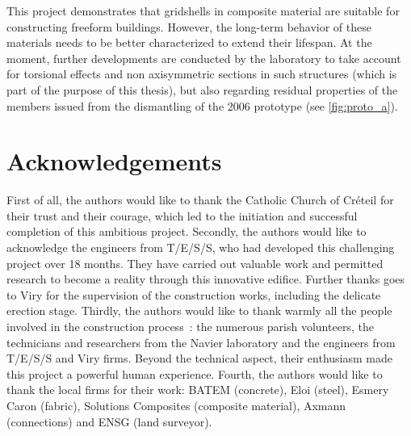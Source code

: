 This project demonstrates that gridshells in composite material are suitable for constructing freeform buildings. However, the long-term behavior of these materials needs to be better characterized to extend their lifespan. At the moment, further developments are conducted by the laboratory to take account for torsional effects and non axisymmetric sections in such structures (which is part of the purpose of this thesis), but also regarding residual properties of the members issued from the dismantling of the 2006 prototype \cite{Douthe2017} (see \cref{fig:proto_a}).

\section{Acknowledgements}
First of all, the authors would like to thank the Catholic Church of Créteil for their trust and their courage, which led to the initiation and successful completion of this ambitious project. Secondly, the authors would like to acknowledge the engineers from T/E/S/S, who had developed this challenging project over 18 months. They have carried out valuable work and permitted research to become a reality through this innovative edifice. Further thanks goes to Viry for the supervision of the construction works, including the delicate erection stage. Thirdly, the authors would like to thank warmly all the people involved in the construction process~: the numerous parish volunteers, the technicians and researchers from the Navier laboratory and the engineers from T/E/S/S and Viry firms. Beyond the technical aspect, their enthusiasm made this project a powerful human experience. Fourth, the authors would like to thank the local firms for their work: BATEM (concrete), Eloi (steel), Esmery Caron (fabric), Solutions Composites (composite material), Axmann (connections) and ENSG (land surveyor). 



